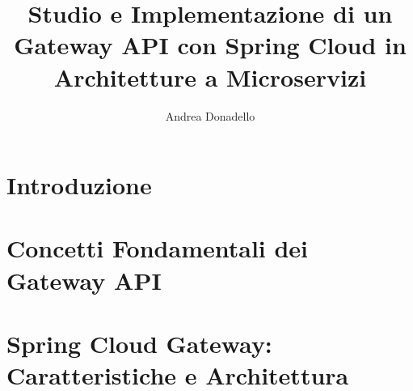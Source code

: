 \documentclass[a4paper]{book}
\title{Studio e Implementazione di un Gateway API con Spring Cloud in Architetture a Microservizi}
\author{Andrea Donadello}
\begin{document}
    \maketitle

    

    \tableofcontents

    \chapter{Introduzione}
    

    \chapter[Concetti Fondamentali]{Concetti Fondamentali dei Gateway API}
    

    \chapter[Spring Cloud Gateway]{Spring Cloud Gateway: Caratteristiche e Architettura}
    
\end{document}
